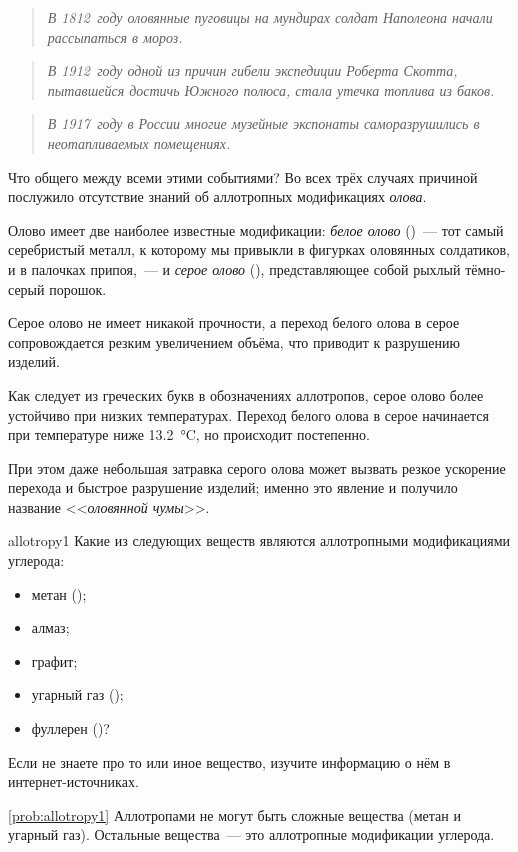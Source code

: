 \begin{quote}
    \textit{В 1812~году оловянные пуговицы на мундирах солдат Наполеона начали рассыпаться в мороз.}
\end{quote}

\begin{quote}
    \textit{В 1912~году одной из причин гибели экспедиции Роберта Скотта, пытавшейся достичь Южного полюса, стала утечка топлива из баков.}
\end{quote}

\begin{quote}
    \textit{В 1917~году в России многие музейные экспонаты саморазрушились в неотапливаемых помещениях.}
\end{quote}

Что общего между всеми этими событиями? Во всех трёх случаях причиной послужило отсутствие знаний об аллотропных модификациях \emph{олова}.

Олово имеет две наиболее известные модификации: \emph{белое олово} ()~--- тот самый серебристый металл, к которому мы привыкли в фигурках оловянных солдатиков, и в палочках припоя,~--- и \emph{серое олово} (), представляющее собой рыхлый тёмно-серый порошок.

Серое олово не имеет никакой прочности, а переход белого олова в серое сопровождается резким увеличением объёма, что приводит к разрушению изделий.

Как следует из греческих букв в обозначениях аллотропов, серое олово более устойчиво при низких температурах. Переход белого олова в серое начинается при температуре ниже \qty[retain-explicit-plus]{+13,2}{\degreeCelsius}, но происходит постепенно.

При этом даже небольшая затравка серого олова может вызвать резкое ускорение перехода и быстрое разрушение изделий; именно это явление и получило название <<\emph{оловянной чумы}>>.

\begin{problem}{}{allotropy1}
    Какие из следующих веществ являются аллотропными модификациями углерода:
    \begin{itemize}
        \item метан ();
        \item алмаз;
        \item графит;
        \item угарный газ ();
        \item фуллерен ()?
    \end{itemize}
    Если не знаете про то или иное вещество, изучите информацию о нём в интернет-источниках.
    \begin{sol}{\ref{prob:allotropy1}}
        Аллотропами не могут быть сложные вещества (метан и угарный газ). Остальные вещества~--- это аллотропные модификации углерода.
    \end{sol}
\end{problem}

